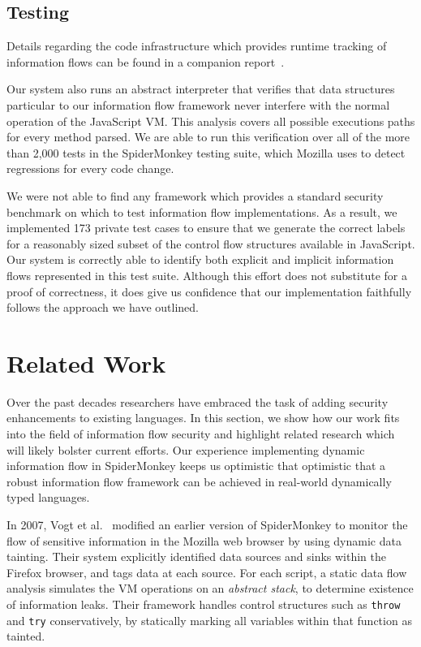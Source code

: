 \documentclass[11pt,onecolumn]{article}
\begin{document}

\subsection{Testing}

Details regarding the code infrastructure which provides runtime tracking of information flows can be found in a companion report~\cite{tr1101}.

Our system also runs an abstract interpreter that verifies that data structures particular to our information flow framework never interfere with the normal operation of the JavaScript VM.
This analysis covers all possible executions paths for every method parsed.
We are able to run this verification over all of the more than 2,000 tests in the SpiderMonkey testing suite, which Mozilla uses to detect regressions for every code change.

We were not able to find any framework which provides a standard security benchmark on which to test information flow implementations.
As a result, we implemented 173 private test cases to ensure that we generate the correct labels for a reasonably sized subset of the control flow structures available in JavaScript.
Our system is correctly able to identify both explicit and implicit information flows represented in this test suite.
Although this effort does not substitute for a proof of correctness, it does give us confidence that our implementation faithfully follows the approach we have outlined.

\section{Related Work}\label{sec:related-work}

Over the past decades researchers have embraced the task of adding security enhancements to existing languages.
In this section, we show how our work fits into the field of information flow security and highlight related research which will likely bolster current efforts.
Our experience implementing dynamic information flow in SpiderMonkey keeps us optimistic that optimistic that a robust information flow framework can be achieved in real-world dynamically typed languages.

In 2007, Vogt et al.~\cite{Vogt_CrossSiteScripting_2007} modified an earlier version of SpiderMonkey to monitor the flow of sensitive information in the Mozilla web browser by using dynamic data tainting.
Their system explicitly identified data sources and sinks within the Firefox browser, and tags data at each source.
For each script, a static data flow analysis simulates the VM operations on an \emph{abstract stack}, to determine existence of information leaks.
Their framework handles control structures such as \texttt{throw} and \texttt{try} conservatively, by statically marking all variables within that function as tainted.
\end{document}
